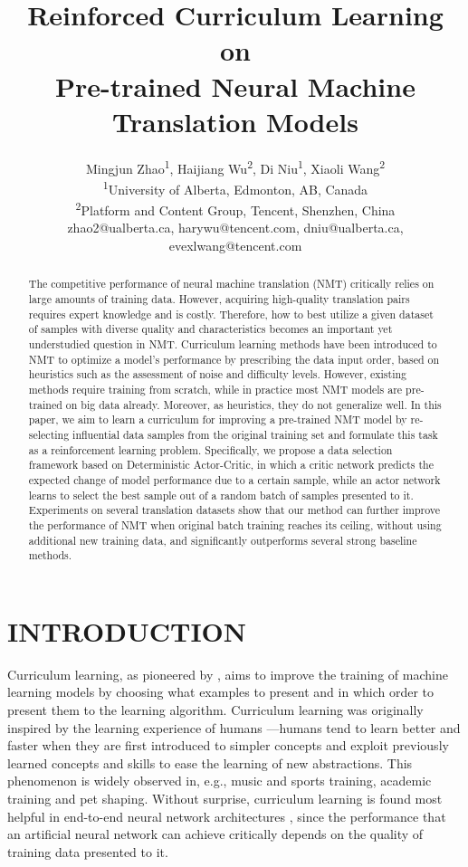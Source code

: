 \documentclass[letterpaper]{article}
\title{Reinforced Curriculum Learning on\\ Pre-trained Neural Machine Translation Models}
\author{Mingjun Zhao\textsuperscript{\rm 1}, Haijiang Wu\textsuperscript{\rm 2}, Di Niu\textsuperscript{\rm 1}, Xiaoli Wang\textsuperscript{\rm 2}\\ %
\textsuperscript{\rm 1}University of Alberta, Edmonton, AB, Canada\\
\textsuperscript{\rm 2}Platform and Content Group, Tencent, Shenzhen, China\\
zhao2@ualberta.ca, harywu@tencent.com, dniu@ualberta.ca, evexlwang@tencent.com
}%
\begin{document}
\maketitle

\begin{abstract}
The competitive performance of neural machine translation (NMT) critically relies on large amounts of training data. However, acquiring high-quality translation pairs requires expert knowledge and is costly. Therefore, how to best utilize a given dataset of samples with diverse quality and characteristics becomes an important yet understudied question in NMT. Curriculum learning methods have been introduced to NMT to optimize a model's performance by prescribing the data input order, based on heuristics such as the assessment of noise and difficulty levels. However, existing methods require training from scratch, while in practice most NMT models are pre-trained on big data already. Moreover, as heuristics, they do not generalize well. In this paper, we aim to learn a curriculum for  improving a pre-trained NMT model by re-selecting influential data samples from the original training set and formulate this task as a reinforcement learning problem. Specifically, we propose a data selection framework based on Deterministic Actor-Critic, in which a critic network predicts the expected change of model performance due to a certain sample, while an actor network learns to select the best sample out of a random batch of samples presented to it.
Experiments on several translation datasets show that our method can further improve the performance of NMT when original batch training reaches its ceiling, without using additional new training data, and significantly outperforms several strong baseline methods.
\end{abstract}

\section{INTRODUCTION}
\label{sec:intro}


Curriculum learning, as pioneered by \cite{bengio2009curriculum}, aims to improve the training of machine learning models by choosing what examples to present and in which order to present them to the learning algorithm. Curriculum learning was originally inspired by the learning experience of humans \cite{skinner1958reinforcement} \cite{peterson2004day} \cite{krueger2009flexible}---humans tend to learn better and faster when they are first introduced to simpler concepts and exploit previously learned concepts and skills to ease the learning of new abstractions. This phenomenon is widely observed in, e.g., music and sports training, academic training and pet shaping.
Without surprise, curriculum learning is found most helpful in end-to-end neural network architectures \cite{bengio2009curriculum}, since the performance that an artificial neural network can achieve critically depends on the quality of training data presented to it.
\end{document}

